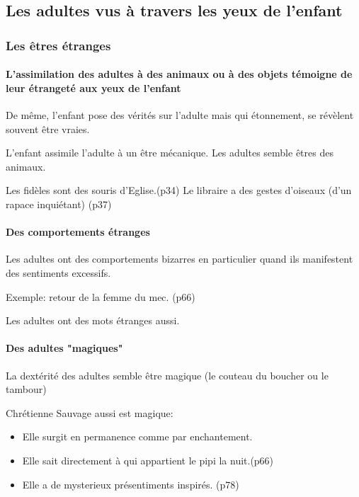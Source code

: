 \documentclass[a4paper, 11pt, hidelinks]{article}
\newcommand{\bs}{\bigskip}
\begin{document}
\subsection{Les adultes vus à travers les yeux de l'enfant}


\subsubsection{Les êtres étranges}

\paragraph{L'assimilation des adultes à des animaux ou à des objets témoigne de leur étrangeté aux yeux de l'enfant}


De même, l'enfant pose des vérités sur l'adulte mais qui étonnement, se révèlent souvent être vraies.


L'enfant assimile l'adulte à un être mécanique. Les adultes semble êtres des animaux.


Les fidèles sont des souris d'Eglise.(p34) Le libraire a des gestes d'oiseaux (d'un rapace inquiétant) (p37)


\paragraph{Des comportements étranges}


Les adultes ont des comportements bizarres en particulier quand ils manifestent des sentiments excessifs.

Exemple: retour de la femme du mec. (p66)

\bs

Les adultes ont des mots étranges aussi.

\paragraph{Des adultes "magiques"}


La dextérité des adultes semble être magique (le couteau du boucher ou le tambour)


Chrétienne Sauvage aussi est magique:

\begin{itemize}
    \item Elle surgit en permanence comme par enchantement.
    \item Elle sait directement à qui appartient le pipi la nuit.(p66)
    \item Elle a de mysterieux présentiments inspirés. (p78)
\end{itemize}
\end{document}
